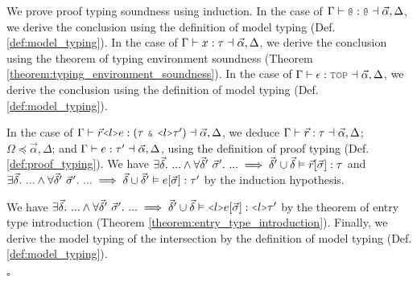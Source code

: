 \documentclass[acmsmall]{acmart}
\theoremstyle{definition}
\begin{document}
  
We prove proof typing soundness using induction.
In the case of $\Gamma \entails \J{@} \hastype \J{@} \given \vec{\alpha}, \Delta$,
we derive the conclusion using the definition of model typing (Def. \ref{def:model_typing}).
In the case of $\Gamma \vdash x : \tau \dashv \vec{\alpha}, \Delta$,
we derive the conclusion using the theorem of typing environment soundness (Theorem \ref{theorem:typing_environment_soundness}).
In the case of $\Gamma \entails \epsilon \hastype \J{TOP} \given \vec{\alpha}, \Delta$,
we derive the conclusion using the definition of model typing (Def. \ref{def:model_typing}).



In the case of $\Gamma \entails \vec{r} \J{<}l \J{>} e \hastype (\tau\ \J{\&}\ \J{<} l \J{>} \tau') \given \vec{\alpha}, \Delta$,
we deduce $\Gamma \vdash \vec{r} : \tau \dashv \vec{\alpha}, \Delta$; $\Omega \preceq \vec{\alpha}, \Delta$; and $\Gamma \vdash e : \tau' \dashv \vec{\alpha}, \Delta$,
using the definition of proof typing (Def. \ref{def:proof_typing}).
We have 
$\exists \vec{\delta}.\ 
... \land
\forall \vec{\delta}'\ \vec{\sigma}'.\ 
... \implies \vec{\delta}' \cup \vec{\delta} \satisfies \vec{r}[\vec{\sigma}] \hastype \tau$ 
and
$\exists \vec{\delta}.\  
... \land
\forall \vec{\delta}'\ \vec{\sigma}'.\ 
... \implies \vec{\delta} \cup \vec{\delta}' \satisfies e[\vec{\sigma}] \hastype \tau'$
by the induction hypothesis.

We have
$\exists \vec{\delta}.\  
... \land
\forall \vec{\delta}'\ \vec{\sigma}'.\ 
... \implies \vec{\delta}' \cup \vec{\delta} \satisfies \J{<}l\J{>}e[\vec{\sigma}] \hastype \J{<}l\J{>}\tau'$
by the theorem of entry type introduction (Theorem \ref{theorem:entry_type_introduction}).
Finally, we derive the model typing of the intersection by the definition of model typing (Def. \ref{def:model_typing}).



$\square$
\end{document}
